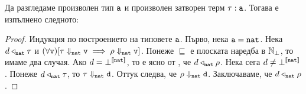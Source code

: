 \begin{proposition}\label{pr:pcf:adequacy:implication}
  Да разгледаме произволен тип $\vv{a}$ и произволен затворен терм $\tau : \vv{a}$.
  Тогава е изпълнено следното:
  \begin{prooftree}
  \end{prooftree}
\end{proposition}
\begin{proof}
  Индукция по построението на типовете $\vv{a}$.
  Първо, нека $\vv{a} = \vv{nat}$. 
  Нека $d \triangleleft_{\vv{nat}} \tau$ и $(\forall \vv{v})[\tau \Downarrow_{\vv{nat}} \vv{v} \implies \rho \Downarrow_{\vv{nat}} \vv{v}]$.
  Понеже $\sqsubseteq$ е плоската наредба в $\Nat_\bot$, то имаме два случая.
  Ако $d = \bot^{\val{\vv{nat}}}$, то е ясно от , че $d \triangleleft_{\vv{nat}} \rho$.
  Нека сега $d \neq \bot^{\val{\vv{nat}}}$. 
  Понеже $d \triangleleft_{\vv{nat}} \tau$, то $\tau \Downarrow_{\vv{nat}} \vv{d}$.
  Оттук следва, че $\rho \Downarrow_{\vv{nat}} \vv{d}$. Заключаваме, че $d \triangleleft_{\vv{nat}} \rho$.


\end{proof}
